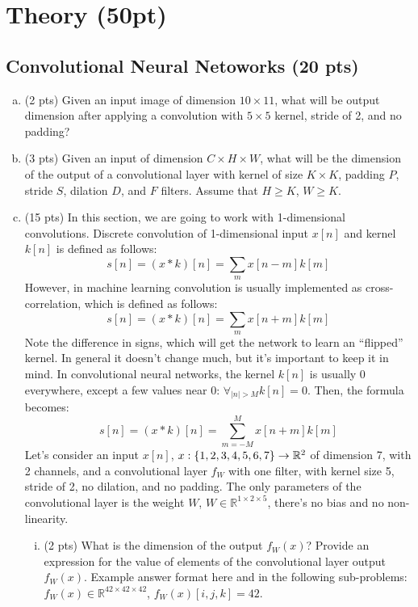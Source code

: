 
\section{Theory (50pt)}

\subsection{Convolutional Neural Netoworks (20 pts)}

\begin{enumerate}[(a)]
\item (2 pts)
Given an input image of dimension $10 \times 11$, what will be output dimension after applying a convolution with $5 \times 5$ kernel, stride of 2, and no padding?

\item (3 pts)
Given an input of dimension $C \times H \times W$, what will be the dimension of the output of a convolutional layer with kernel of size $K \times K$, padding $P$, stride $S$, dilation $D$, and $F$ filters. Assume that $H \geq K$, $W \geq K$.


\item (15 pts) In this section, we are going to work with 1-dimensional convolutions. Discrete convolution of 1-dimensional input $x[n]$ and kernel $k[n]$ is defined as follows:
$$
s[n] = (x * k)[n] = \sum_m x[n - m]k[m]
$$
However, in machine learning convolution is usually implemented as cross-correlation, which is defined as follows:
$$
s[n] = (x * k)[n] = \sum_m x[n + m]k[m]
$$
Note the difference in signs, which will get the network to learn an ``flipped'' kernel. In general it doesn't change much, but it's important to keep it in mind. In convolutional neural networks, the kernel $k[n]$ is usually $0$ everywhere, except a few values near 0: $\forall_{\vert n \vert > M} k[n] = 0$. Then, the formula becomes:
$$
s[n] = (x * k)[n] = \sum_{m=-M}^M x[n + m]k[m]
$$
Let's consider an input $x[n]$, $x: \{1, 2, 3, 4, 5, 6, 7\} \to \mathbb{R}^{2}$ of dimension 7, with 2 channels, and a convolutional layer $f_W$ with one filter, with kernel size 5, stride of 2, no dilation, and no padding. The only parameters of the convolutional layer is the weight $W$, $W \in \mathbb{R}^{1\times 2 \times 5}$, there's no bias and no non-linearity.

\begin{enumerate}[(i)]
    \item (2 pts) What is the dimension of the output $f_W(x)$? Provide an expression for the value of elements of the convolutional layer output $f_W(x)$. Example answer format here and in the following sub-problems: $f_W(x) \in \mathbb{R}^{42 \times 42 \times 42}$, $f_W(x)[i, j, k]=42$.
    

\end{enumerate}
\end{enumerate}
